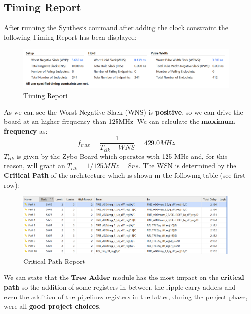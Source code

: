 \subsection{Timing Report}
After running the Synthesis command after adding the clock constraint the following Timing Report has been displayed:
\begin{figure}[H]
	\centering
	\includegraphics[width=\textwidth]{img/vivado/timing.png}
	\caption{Timing Report}
\end{figure}
As we can see the Worst Negative Slack (WNS) is \textbf{positive}, so we can drive the board at an higher frequency than 125MHz. We can calculate the \textbf{maximum frequency} as:
\begin{equation}
	f_{max} = \frac{1}{T_{clk} - WNS} = 429.0 MHz
\end{equation}
$T_{clk}$ is given by the Zybo Board which operates with 125 MHz and, for this reason, will grant an $T_{clk} = 1/125MHz = 8ns$. The WSN is determined by the \textbf{Critical Path} of the architecture which is shown in the following table (see first row):
\begin{figure}[H]
	\centering
	\includegraphics[width=\textwidth]{img/vivado/critical_path.png}
	\caption{Critical Path Report}
\end{figure}
We can state that the \textbf{Tree Adder} module has the most impact on the \textbf{critical path} so the addition of some registers in between the ripple carry adders and even the addition of the pipelines registers in the latter, during the project phase, were all \textbf{good project choices}.
